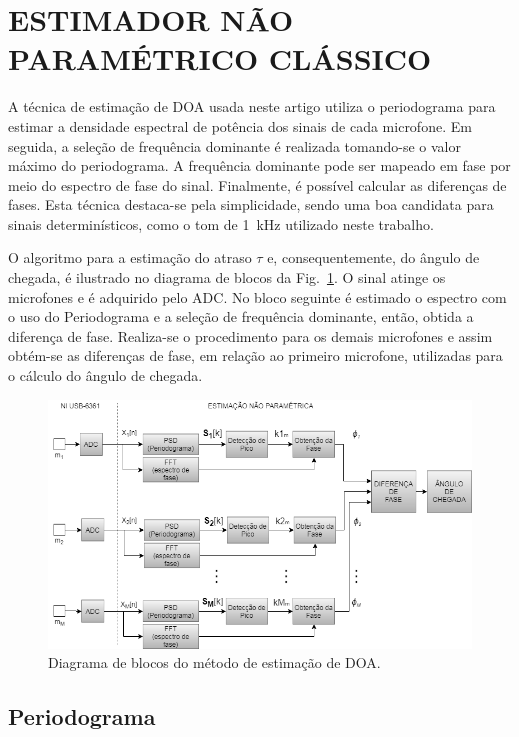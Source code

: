 \documentclass{sbrt2017port}
\begin{document}
\section{ESTIMADOR NÃO PARAMÉTRICO CLÁSSICO}
\label{sec_est_classico}
A técnica de estimação de DOA usada neste artigo utiliza o periodograma para estimar a densidade espectral de potência dos sinais de cada microfone. Em seguida, a seleção de frequência dominante é realizada tomando-se o valor máximo do periodograma. A frequência dominante pode ser mapeado em fase por meio do espectro de fase do sinal. Finalmente, é possível calcular as diferenças de fases. Esta técnica destaca-se pela simplicidade, sendo uma boa candidata para sinais determinísticos, como o tom de 1~kHz utilizado neste trabalho.

O algoritmo para a estimação do atraso $\tau$ e, consequentemente, do ângulo de chegada, é ilustrado no diagrama de blocos da Fig.~\ref{fig:diagram}. O sinal atinge os microfones e é adquirido pelo ADC. No bloco seguinte é estimado o espectro com o uso do Periodograma e a seleção de frequência dominante, então, obtida a diferença de fase. Realiza-se o procedimento para os demais microfones e assim obtém-se as diferenças de fase, em relação ao primeiro microfone, utilizadas para o cálculo do ângulo de chegada. 
 
\begin{figure}[!htb]
     \centering
     \includegraphics[width=\columnwidth]{images/angle_estimation_diagram}
     \caption{Diagrama de blocos do método de estimação de DOA.}
     \label{fig:diagram}
\end{figure}
    
 
\subsection{Periodograma}
\end{document}
